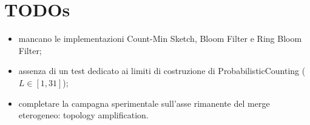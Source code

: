 \section{TODOs}
\begin{itemize}
    \item mancano le implementazioni Count-Min Sketch, Bloom Filter e Ring Bloom Filter;
    \item assenza di un test dedicato ai limiti di costruzione di ProbabilisticCounting (\(L \in [1,31]\));
    \item completare la campagna sperimentale sull'asse rimanente del merge eterogeneo:
    topology amplification.
\end{itemize}

